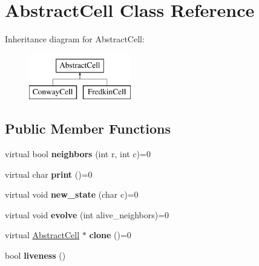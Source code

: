 \hypertarget{classAbstractCell}{\section{\-Abstract\-Cell \-Class \-Reference}
\label{classAbstractCell}
}
\-Inheritance diagram for \-Abstract\-Cell\-:\begin{figure}[H]
\begin{center}
\leavevmode
\includegraphics[height=2.000000cm]{classAbstractCell}
\end{center}
\end{figure}
\subsection*{\-Public \-Member \-Functions}
\begin{DoxyCompactItemize}
\item 
\hypertarget{classAbstractCell_a59e5760808472406406e19666c2d0863}{virtual bool {\bfseries neighbors} (int r, int c)=0}\label{classAbstractCell_a59e5760808472406406e19666c2d0863}

\item 
\hypertarget{classAbstractCell_a92b09a18668608a1e259628efb6f5e71}{virtual char {\bfseries print} ()=0}\label{classAbstractCell_a92b09a18668608a1e259628efb6f5e71}

\item 
\hypertarget{classAbstractCell_a90c01c375239e007e12464beeca32fbf}{virtual void {\bfseries new\-\_\-state} (char c)=0}\label{classAbstractCell_a90c01c375239e007e12464beeca32fbf}

\item 
\hypertarget{classAbstractCell_a929ecdd2332108f8a88254a5d42981f6}{virtual void {\bfseries evolve} (int alive\-\_\-neighbors)=0}\label{classAbstractCell_a929ecdd2332108f8a88254a5d42981f6}

\item 
\hypertarget{classAbstractCell_a6fd8f93b5a1547280fec2cb74241af38}{virtual \hyperlink{classAbstractCell}{\-Abstract\-Cell} $\ast$ {\bfseries clone} ()=0}\label{classAbstractCell_a6fd8f93b5a1547280fec2cb74241af38}

\item 
\hypertarget{classAbstractCell_aeb2438018c3f65b08272cb1d22dc6cbd}{bool {\bfseries liveness} ()}\label{classAbstractCell_aeb2438018c3f65b08272cb1d22dc6cbd}

\end{DoxyCompactItemize}

